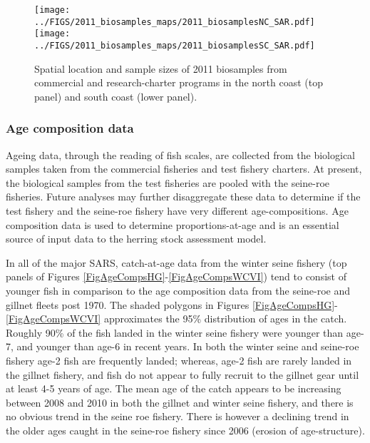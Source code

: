 	
	
	
	

\begin{figure}[htbp]
	\centering
		\texttt{[image: ../FIGS/2011\_biosamples\_maps/2011\_biosamplesNC\_SAR.pdf]}
		\texttt{[image: ../FIGS/2011\_biosamples\_maps/2011\_biosamplesSC\_SAR.pdf]}
		
	\caption{Spatial location and sample sizes of 2011 biosamples from commercial and research-charter programs in the north coast (top panel) and south coast (lower panel).}
	\label{fig:FIGS_2011_biosamples_maps_2011_biosamplesNC_SAR}
\end{figure}
	

	
	
	\subsubsection{Age composition data}
	
	Ageing data, through the reading of fish scales, are collected from the biological samples taken from the commercial fisheries and test fishery charters.  At present, the biological samples from the test fisheries are pooled with the seine-roe fisheries. Future analyses may further disaggregate these data to determine if the test fishery and the seine-roe fishery have very different age-compositions. Age composition data is used to determine proportions-at-age and is an essential source of input data to the herring stock assessment model.
	
	In all of the major SARS, catch-at-age data from the winter seine fishery (top panels of Figures \ref{FigAgeCompsHG}-\ref{FigAgeCompsWCVI}) tend to consist of younger fish in comparison to the age composition data from the seine-roe and gillnet fleets post 1970. The shaded polygons in Figures \ref{FigAgeCompsHG}-\ref{FigAgeCompsWCVI} approximates the 95\% distribution of ages in the catch.  Roughly 90\% of the fish landed in the winter seine fishery were younger than age-7, and younger than age-6 in recent years.  In both the winter seine and seine-roe fishery age-2 fish are frequently landed; whereas, age-2 fish are rarely landed in the gillnet fishery, and fish do not appear to fully recruit to the gillnet gear until at least 4-5 years of age.  The mean age of the catch appears to be increasing between 2008 and 2010 in both the gillnet and winter seine fishery, and there is no obvious trend in the seine roe fishery.  There is however a declining trend in the older ages caught in the seine-roe fishery since 2006 (erosion of age-structure).

